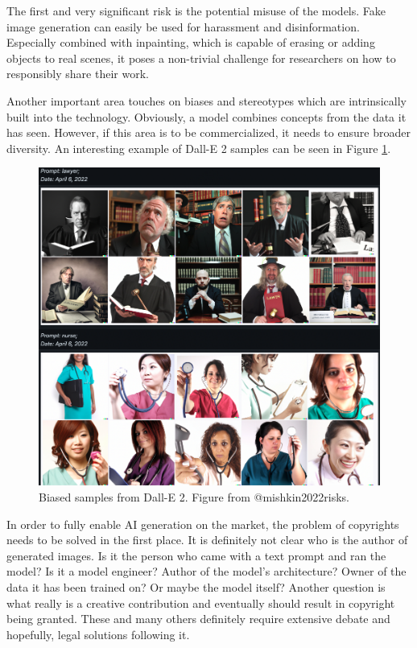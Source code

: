 \documentclass[
]{krantz}
\begin{document}
The first and very significant risk is the potential misuse of the models. Fake image generation can easily be used for harassment and disinformation. Especially combined with inpainting, which is capable of erasing or adding objects to real scenes, it poses a non-trivial challenge for researchers on how to responsibly share their work.

Another important area touches on biases and stereotypes which are intrinsically built into the technology. Obviously, a model combines concepts from the data it has seen. However, if this area is to be commercialized, it needs to ensure broader diversity. An interesting example of Dall-E 2 samples can be seen in Figure \ref{fig:bias}.

\begin{figure}

{\centering \includegraphics[width=1\linewidth]{figures/02-02-text-2-img/bias} 

}

\caption{Biased samples from Dall-E 2. Figure from @mishkin2022risks.}\label{fig:bias}
\end{figure}

In order to fully enable AI generation on the market, the problem of copyrights needs to be solved in the first place. It is definitely not clear who is the author of generated images. Is it the person who came with a text prompt and ran the model? Is it a model engineer? Author of the model's architecture? Owner of the data it has been trained on? Or maybe the model itself? Another question is what really is a creative contribution and eventually should result in copyright being granted. These and many others definitely require extensive debate and hopefully, legal solutions following it.
\end{document}
